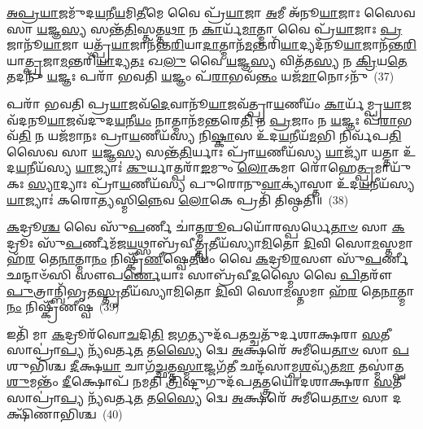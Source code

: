 \-\ul{𑌅}\-\-\ul{𑌪𑍍𑌰}\-\-\ul{𑌯𑌾}\-𑌜𑌮𑍁᳴𑌦\-\ul{𑌯}\-𑌨𑍀\-\ul{𑌯}\-𑌮𑌿\-\ul{𑌤𑍀}\-𑌮𑍇 𑌵𑍈 𑌪𑍍𑌰᳴\-\ul{𑌯𑌾}\-𑌜𑌾 \ul{𑌅}\-𑌮𑍀 𑌅᳴𑌨𑍂\-\ul{𑌯𑌾}\-𑌜𑌾𑌃 𑌸𑍈𑌵 𑌸𑌾 \ul{𑌯}\-𑌜𑍍𑌞\-\ul{𑌸𑍍𑌯} 𑌸𑌨𑍍𑌤᳴\-\ul{𑌤𑌿}\-𑌸𑍍𑌤𑌤𑍍𑌤\-\ul{𑌥𑌾} 𑌨 \ul{𑌕𑌾}\-𑌰𑍍𑌯᳴\-\ul{𑌮𑌾}\-𑌤𑍍𑌮𑌾 𑌵𑍈 𑌪𑍍𑌰᳴\-\ul{𑌯𑌾}\-𑌜𑌾𑌃 \ul{𑌪𑍍𑌰}\-𑌜𑌾𑌨𑍂᳴\-\ul{𑌯𑌾}\-𑌜𑌾 𑌯𑌤𑍍𑌪𑍍𑌰᳴\-\ul{𑌯𑌾}\-𑌜𑌾𑌨᳴𑌨𑍍𑌤\-\ul{𑌰𑌿}\-𑌯𑌾\-\ul{𑌦𑌾}\-𑌤𑍍𑌮𑌾𑌨᳴\-\ul{𑌮}\-𑌨𑍍𑌤𑌰𑌿᳴\-\ul{𑌯𑌾}\-𑌦𑍍𑌯𑌦᳴𑌨𑍂\-\ul{𑌯𑌾}\-𑌜𑌾𑌨᳴𑌨𑍍𑌤\-\ul{𑌰𑌿}\-𑌯𑌾\-\ul{𑌤𑍍𑌪𑍍𑌰}\-𑌜𑌾\-\ul{𑌮}\-𑌨𑍍𑌤𑌰𑌿᳴\-\ul{𑌯𑌾}\-𑌦𑍍𑌯\-\ul{𑌤𑌃} 𑌖\-\ul{𑌲𑍁} 𑌵𑍈 \ul{𑌯}\-𑌜𑍍𑌞\-\ul{𑌸𑍍𑌯} 𑌵𑌿𑌤᳴𑌤\-\ul{𑌸𑍍𑌯} 𑌨 \ul{𑌕𑍍𑌰𑌿}\-𑌯\-\ul{𑌤𑍇} 𑌤𑌦𑌨𑍁᳴ \ul{𑌯}\-𑌜𑍍𑌞𑌃 𑌪𑌰𑌾᳴ 𑌭𑌵𑌤𑌿 \ul{𑌯}\-𑌜𑍍𑌞𑌂 𑌪᳴\-\ul{𑌰𑌾}\-𑌭𑌵᳴\-\ul{𑌨𑍍𑌤𑌂} 𑌯𑌜᳴\-\ul{𑌮𑌾}\-𑌨𑍋\-𑌽𑌨𑍁᳴~(37)

𑌪𑌰𑌾᳴ 𑌭𑌵𑌤𑌿 𑌪𑍍𑌰\-\ul{𑌯𑌾}\-𑌜𑌵᳴\-\ul{𑌦𑍇}\-𑌵𑌾𑌨𑍂᳴\-\ul{𑌯𑌾}\-𑌜𑌵᳴𑌤𑍍𑌪𑍍𑌰𑌾\-\ul{𑌯}\-𑌣𑍀𑌯𑌂᳴ \ul{𑌕𑌾}\-𑌰𑍍𑌯᳴𑌮𑍍𑌪𑍍𑌰\-\ul{𑌯𑌾}\-𑌜𑌵᳴𑌦𑌨𑍂\-\ul{𑌯𑌾}\-𑌜𑌵᳴𑌦𑍁𑌦\-\ul{𑌯}\-𑌨𑍀\-\ul{𑌯𑌂} 𑌨𑌾𑌤𑍍𑌮𑌾𑌨᳴𑌮\-\ul{𑌨𑍍𑌤}\-𑌰𑍇\-\ul{𑌤𑌿} 𑌨 \ul{𑌪𑍍𑌰}\-𑌜𑌾𑌂 𑌨 \ul{𑌯}\-𑌜𑍍𑌞𑌃 𑌪᳴\-\ul{𑌰𑌾}\-𑌭𑌵᳴\-\ul{𑌤𑌿} 𑌨 𑌯𑌜᳴𑌮𑌾𑌨𑌃 𑌪𑍍𑌰𑌾\-\ul{𑌯}\-𑌣𑍀𑌯᳴𑌸𑍍𑌯 𑌨𑌿\-\ul{𑌷𑍍𑌕𑌾}\-𑌸 𑌉᳴𑌦\-\ul{𑌯}\-𑌨𑍀𑌯᳴\-\ul{𑌮}\-𑌭𑌿 𑌨𑌿𑌰𑍍𑌵᳴𑌪\-\ul{𑌤𑌿} 𑌸𑍈𑌵 𑌸𑌾 \ul{𑌯}\-𑌜𑍍𑌞\-\ul{𑌸𑍍𑌯} 𑌸𑌨𑍍𑌤᳴\-\ul{𑌤𑌿}\-𑌰𑍍𑌯𑌾𑌃 𑌪𑍍𑌰𑌾᳴\-\ul{𑌯}\-𑌣𑍀𑌯᳴𑌸𑍍𑌯 \ul{𑌯𑌾}\-𑌜𑍍𑌯𑌾᳴ 𑌯𑌤𑍍𑌤𑌾 𑌉᳴𑌦\-\ul{𑌯}\-𑌨𑍀𑌯᳴𑌸𑍍𑌯 \ul{𑌯𑌾}\-𑌜𑍍𑌯𑌾𑌃॑ \ul{𑌕𑍁}\-𑌰𑍍𑌯𑌾𑌤𑍍𑌪𑌰𑌾᳴\-\ul{𑌙}\-𑌮𑍁𑌂 \ul{𑌲𑍋}\-𑌕𑌮𑌾 𑌰𑍋᳴𑌹𑍇\-\ul{𑌤𑍍𑌪𑍍𑌰}\-𑌮𑌾𑌯𑍁᳴𑌕𑌃 \ul{𑌸𑍍𑌯𑌾}\-𑌦𑍍𑌯𑌾𑌃 𑌪𑍍𑌰𑌾᳴\-\ul{𑌯}\-𑌣𑍀𑌯᳴𑌸𑍍𑌯 𑌪𑍁𑌰𑍋𑌨𑍁\-\ul{𑌵𑌾}\-𑌕𑍍𑌯𑌾॑𑌸𑍍𑌤𑌾 𑌉᳴𑌦\-\ul{𑌯}\-𑌨𑍀𑌯᳴𑌸𑍍𑌯 \ul{𑌯𑌾}\-𑌜𑍍𑌯𑌾𑌃॑ 𑌕𑌰𑍋\-\ul{𑌤𑍍𑌯}\-𑌸𑍍𑌮𑌿\-\ul{𑌨𑍍𑌨𑍇}\-𑌵 \ul{𑌲𑍋}\-𑌕𑍇 𑌪𑍍𑌰𑌤𑌿᳴ 𑌤𑌿𑌷𑍍𑌠𑌤𑌿॥~(38)

{\anuvakamend[{𑌪𑍍𑌰𑌜𑍍𑌞𑌾॑𑌤𑍍𑌯𑍈 𑌪𑌶𑍍𑌯𑌤𑍍𑌯𑌨𑍂\-\ul{𑌯𑌾}\-𑌜\-\ul{𑌵}\-𑌦𑍍𑌯𑌜᳴\-\ul{𑌮𑌾}\-𑌨𑍋\-𑌽𑌨𑍁᳴ 𑌪𑍁𑌰𑍋𑌨𑍁\-\ul{𑌵𑌾}\-𑌕𑍍𑌯𑌾॑𑌸𑍍𑌤𑌾 \ul{𑌅}\-𑌷𑍍𑌟𑍗 𑌚᳴}]}%

\-\ul{𑌕}\-𑌦𑍍𑌰𑍂\-\ul{𑌶𑍍𑌚} 𑌵𑍈 𑌸𑍁᳴\-\ul{𑌪}\-𑌰𑍍𑌣𑍀 𑌚𑌾॑𑌤𑍍𑌮\-\ul{𑌰𑍂}\-𑌪𑌯𑍋᳴𑌰𑌸𑍍𑌪𑌰𑍍𑌧𑍇\-\ul{𑌤𑌾}\-\-\ul{𑍞} 𑌸𑌾 \ul{𑌕}\-𑌦𑍍𑌰𑍂𑌃 𑌸𑍁᳴\-\ul{𑌪}\-𑌰𑍍𑌣𑍀𑌮᳴𑌜\-\ul{𑌯}\-𑌥𑍍𑌸𑌾𑌬𑍍𑌰᳴𑌵𑍀\-\ul{𑌤𑍍𑌤𑍃}\-𑌤𑍀𑌯᳴𑌸𑍍𑌯𑌾\-\ul{𑌮𑌿}\-𑌤𑍋 \ul{𑌦𑌿}\-𑌵𑌿 𑌸𑍋\-\ul{𑌮}\-𑌸𑍍𑌤𑌮𑌾 𑌹᳴\-\ul{𑌰} 𑌤𑍇\-\ul{𑌨𑌾}\-𑌤𑍍𑌮𑌾\-\ul{𑌨𑌂} 𑌨𑌿𑌷𑍍𑌕𑍍𑌰𑍀᳴\-\ul{𑌣𑍀}\-𑌷𑍍𑌵𑍇\-\ul{𑌤𑍀}\-𑌯𑌂 𑌵𑍈 \ul{𑌕}\-𑌦𑍍𑌰𑍂\-\ul{𑌰}\-𑌸𑍗 𑌸𑍁᳴\-\ul{𑌪}\-𑌰𑍍𑌣𑍀 𑌛𑌨𑍍𑌦𑌾𑍞᳴𑌸𑌿 𑌸𑍗𑌪\-\ul{𑌰𑍍𑌣𑍇}\-𑌯𑌾𑌃 𑌸𑌾𑌬𑍍𑌰᳴𑌵𑍀\-\ul{𑌦}\-𑌸𑍍𑌮𑍈 𑌵𑍈 \ul{𑌪𑌿}\-𑌤𑌰𑍗᳴ \ul{𑌪𑍁}\-𑌤𑍍𑌰𑌾𑌨𑍍𑌬𑌿᳴𑌭𑍃𑌤\-\ul{𑌸𑍍𑌤𑍃}\-𑌤𑍀𑌯᳴𑌸𑍍𑌯𑌾\-\ul{𑌮𑌿}\-𑌤𑍋 \ul{𑌦𑌿}\-𑌵𑌿 𑌸𑍋\-\ul{𑌮}\-𑌸𑍍𑌤𑌮𑌾 𑌹᳴\-\ul{𑌰} 𑌤𑍇\-\ul{𑌨𑌾}\-𑌤𑍍𑌮𑌾\-\ul{𑌨𑌂} 𑌨𑌿𑌷𑍍𑌕𑍍𑌰𑍀᳴𑌣𑍀𑌷𑍍𑌵~(39)

𑌇𑌤𑌿᳴ 𑌮𑌾 \ul{𑌕}\-𑌦𑍍𑌰𑍂𑌰᳴𑌵𑍋\-\ul{𑌚}\-𑌦𑌿\-\ul{𑌤𑌿} 𑌜\-\ul{𑌗}\-𑌤𑍍𑌯𑍁𑌦᳴𑌪\-\ul{𑌤}\-𑌚𑍍𑌚𑌤𑍁᳴𑌰𑍍𑌦𑌶𑌾𑌕𑍍𑌷𑌰𑌾 \ul{𑌸}\-𑌤𑍀 𑌸𑌾𑌪𑍍𑌰𑌾॑\-\ul{𑌪𑍍𑌯} 𑌨𑍍𑌯᳴𑌵𑌰𑍍𑌤\-\ul{𑌤} 𑌤\-\ul{𑌸𑍍𑌯𑍈} 𑌦𑍍𑌵𑍇 \ul{𑌅}\-𑌕𑍍𑌷𑌰𑍇᳴ 𑌅𑌮𑍀𑌯𑍇\-\ul{𑌤𑌾}\-\-\ul{𑍞} 𑌸𑌾 \ul{𑌪}\-𑌶𑍁𑌭𑌿᳴𑌶𑍍𑌚 \ul{𑌦𑍀}\-𑌕𑍍𑌷\-\ul{𑌯𑌾} 𑌚𑌾𑌗᳴\-\ul{𑌚𑍍𑌛}\-𑌤𑍍𑌤\-\ul{𑌸𑍍𑌮𑌾}\-𑌜𑍍𑌜𑌗᳴\-\ul{𑌤𑍀} 𑌛𑌨𑍍𑌦᳴𑌸𑌾𑌮𑍍𑌪\-\ul{𑌶}\-𑌵𑍍𑌯᳴𑌤\-\ul{𑌮𑌾} 𑌤𑌸𑍍𑌮𑌾॑𑌤𑍍𑌪\-\ul{𑌶𑍁}\-𑌮𑌨𑍍𑌤𑌂᳴ \ul{𑌦𑍀}\-𑌕𑍍𑌷𑍋𑌪᳴ 𑌨𑌮𑌤𑌿 \ul{𑌤𑍍𑌰𑌿}\-𑌷𑍍𑌟𑍁𑌗𑍁𑌦᳴𑌪\-\ul{𑌤}\-𑌤𑍍𑌤𑍍𑌰𑌯𑍋᳴𑌦𑌶𑌾𑌕𑍍𑌷𑌰𑌾 \ul{𑌸}\-𑌤𑍀 𑌸𑌾𑌪𑍍𑌰𑌾॑\-\ul{𑌪𑍍𑌯} 𑌨𑍍𑌯᳴𑌵𑌰𑍍𑌤\-\ul{𑌤} 𑌤\-\ul{𑌸𑍍𑌯𑍈} 𑌦𑍍𑌵𑍇 \ul{𑌅}\-𑌕𑍍𑌷𑌰𑍇᳴ 𑌅𑌮𑍀𑌯𑍇\-\ul{𑌤𑌾}\-\-\ul{𑍞} 𑌸𑌾 𑌦𑌕𑍍𑌷𑌿᳴𑌣𑌾𑌭𑌿𑌶𑍍𑌚~(40)

